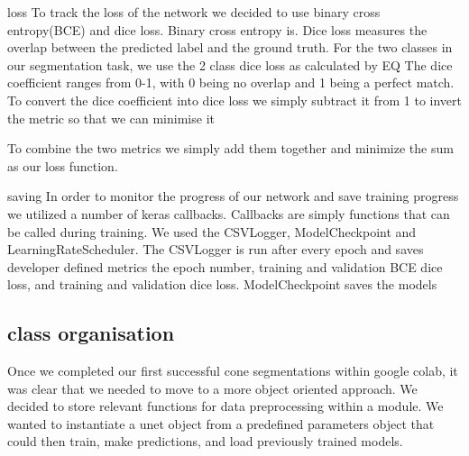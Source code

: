 \documentclass[12pt]{article}
\begin{document}
loss
To track the loss of the network we decided to use binary cross entropy(BCE) and dice loss.
Binary cross entropy is. %
Dice loss measures the overlap between the predicted label and the ground truth.
For the two classes in our segmentation task, we use the 2 class dice loss as calculated by EQ %
The dice coefficient ranges from 0-1, with 0 being no overlap and 1 being a perfect match.
To convert the dice coefficient into dice loss we simply subtract it from 1 to invert the metric so that we can minimise it

To combine the two metrics we simply add them together and minimize the sum as our loss function.

saving
In order to monitor the progress of our network and save training progress we utilized a number of keras callbacks.
Callbacks are simply functions that can be called during training.
We used the CSVLogger, ModelCheckpoint and LearningRateScheduler.
The CSVLogger is run after every epoch and saves developer defined metrics the epoch number, training and validation BCE dice loss, and training and validation dice loss.
ModelCheckpoint saves the models

\subsection{class organisation}
Once we completed our first successful cone segmentations within google colab, it was clear that we needed to move to a more object oriented approach.
We decided to  store relevant functions for data preprocessing within a module. 
We wanted to instantiate a unet object from a predefined parameters object that could then train, make predictions, and load previously trained models.
\end{document}
